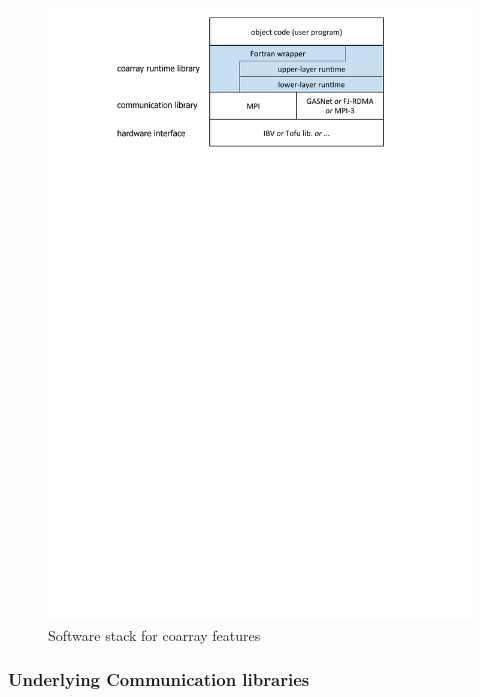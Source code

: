 \begin{figure}[tbh]
  \begin{center}
    \mbox{\includegraphics[trim=27mm 208mm 29mm 0mm, scale=0.7,clip]{figs/softstack-r4.pdf}}
    \caption{Software stack for coarray features}\label{fig:layer}
  \end{center}
\end{figure}


\subsubsection{Underlying Communication libraries}

